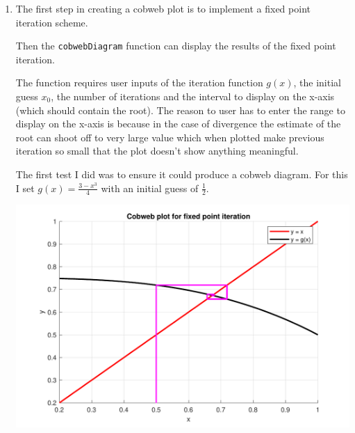 \documentclass[a4paper,11pt]{article}
\begin{document}
\begin{enumerate}
	
	\item The first step in creating a cobweb plot is to implement a fixed 
	point iteration scheme.
	
	Then the \verb*|cobwebDiagram| function can display the results of the 
	fixed point iteration.
	
	The function requires user inputs of the iteration function $g(x)$, 
	the initial guess $x_{0}$, the number of iterations and the interval to 
	display on the x-axis (which should contain the root). The reason to user 
	has to enter the range to display on the x-axis is because in the case of 
	divergence the estimate of the root can shoot off to very large value 
	which when plotted make previous iteration so small that the plot doesn't 
	show anything meaningful.
	
	The first test I did was to ensure it could produce a cobweb diagram. For 
	this I set $g(x) = \frac{3 - x^{3}}{4}$ with an initial guess of 
	$\frac{1}{2}$.
	
	\begin{center}
		\includegraphics[scale=0.6]{images/Q1d_cobweb.pdf}
	\end{center}


\end{enumerate}
\end{document}
